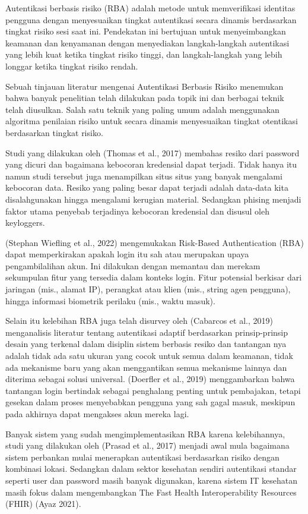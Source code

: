 Autentikasi berbasis risiko (RBA) adalah metode untuk memverifikasi identitas pengguna dengan menyesuaikan tingkat autentikasi secara dinamis berdasarkan tingkat risiko sesi saat ini. Pendekatan ini bertujuan untuk menyeimbangkan keamanan dan kenyamanan dengan menyediakan langkah-langkah autentikasi yang lebih kuat ketika tingkat risiko tinggi, dan langkah-langkah yang lebih longgar ketika tingkat risiko rendah.

Sebuah tinjauan literatur mengenai Autentikasi Berbasis Risiko menemukan bahwa banyak penelitian telah dilakukan pada topik ini dan berbagai teknik telah diusulkan. Salah satu teknik yang paling umum adalah menggunakan algoritma penilaian risiko untuk secara dinamis menyesuaikan tingkat otentikasi berdasarkan tingkat risiko.

Studi yang dilakukan oleh (Thomas et al., 2017) membahas resiko dari password yang dicuri dan bagaimana kebocoran kredensial dapat terjadi. Tidak hanya itu namun studi tersebut juga menampilkan situs situs yang banyak mengalami kebocoran data. Resiko yang paling besar dapat terjadi adalah data-data kita disalahgunakan hingga mengalami kerugian material. Sedangkan phising menjadi faktor utama penyebab terjadinya kebocoran kredensial dan disusul oleh keyloggers.

(Stephan Wiefling et al., 2022) mengemukakan Risk-Based Authentication (RBA) dapat memperkirakan apakah login itu sah atau merupakan upaya pengambilalihan akun. Ini dilakukan dengan memantau dan merekam sekumpulan fitur yang tersedia dalam konteks login. Fitur potensial berkisar dari jaringan (mis., alamat IP), perangkat atau klien (mis., string agen pengguna), hingga informasi biometrik perilaku (mis., waktu masuk).

Selain itu kelebihan RBA juga telah disurvey oleh (Cabarcos et al., 2019) menganalisis literatur tentang autentikasi adaptif berdasarkan prinsip-prinsip desain yang terkenal dalam disiplin sistem berbasis resiko dan tantangan nya adalah tidak ada satu ukuran yang cocok untuk semua dalam keamanan, tidak ada mekanisme baru yang akan menggantikan semua mekanisme lainnya dan diterima sebagai solusi universal. (Doerfler et al., 2019) menggambarkan bahwa tantangan login bertindak sebagai penghalang penting untuk pembajakan, tetapi gesekan dalam proses menyebabkan pengguna yang sah gagal masuk, meskipun pada akhirnya dapat mengakses akun mereka lagi.

Banyak sistem yang sudah mengimplementasikan RBA karena kelebihannya, studi yang dilakukan oleh (Prasad et al., 2017) menjadi awal mula bagaimana sistem perbankan mulai menerapkan autentikasi berdasarkan risiko dengan kombinasi lokasi. Sedangkan dalam sektor kesehatan sendiri autentikasi standar seperti user dan password masih banyak digunakan, karena sistem IT kesehatan masih fokus dalam mengembangkan The Fast Health Interoperability Resources (FHIR) (Ayaz 2021).

